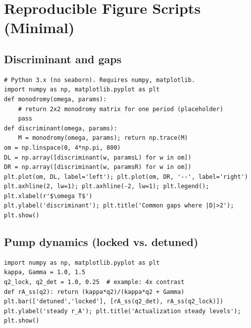 \documentclass[11pt]{article}
\begin{document}
\section{Reproducible Figure Scripts (Minimal)}
\label{app:scripts}
\subsection*{Discriminant and gaps}
\begin{verbatim}
# Python 3.x (no seaborn). Requires numpy, matplotlib.
import numpy as np, matplotlib.pyplot as plt
def monodromy(omega, params): 
    # return 2x2 monodromy matrix for one period (placeholder)
    pass
def discriminant(omega, params): 
    M = monodromy(omega, params); return np.trace(M)
om = np.linspace(0, 4*np.pi, 800)
DL = np.array([discriminant(w, paramsL) for w in om])
DR = np.array([discriminant(w, paramsR) for w in om])
plt.plot(om, DL, label='left'); plt.plot(om, DR, '--', label='right')
plt.axhline(2, lw=1); plt.axhline(-2, lw=1); plt.legend(); plt.xlabel(r'$\omega T$')
plt.ylabel('discriminant'); plt.title('Common gaps where |D|>2'); plt.show()
\end{verbatim}

\subsection*{Pump dynamics (locked vs. detuned)}
\begin{verbatim}
import numpy as np, matplotlib.pyplot as plt
kappa, Gamma = 1.0, 1.5
q2_lock, q2_det = 1.0, 0.25  # example: 4x contrast
def rA_ss(q2): return (kappa*q2)/(kappa*q2 + Gamma)
plt.bar(['detuned','locked'], [rA_ss(q2_det), rA_ss(q2_lock)])
plt.ylabel('steady r_A'); plt.title('Actualization steady levels'); plt.show()
\end{verbatim}
\end{document}
